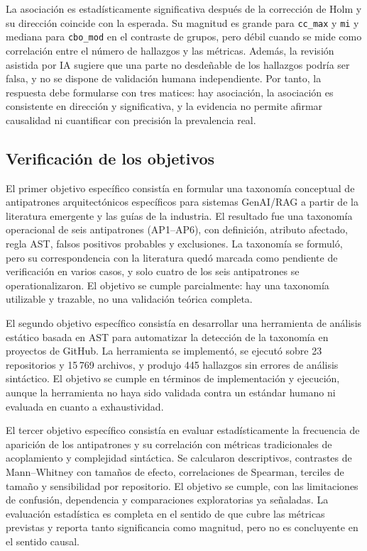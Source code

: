La asociación es estadísticamente significativa después de la corrección de Holm y su dirección coincide con la esperada. Su magnitud es grande para \texttt{cc\_max} y \texttt{mi} y mediana para \texttt{cbo\_mod} en el contraste de grupos, pero débil cuando se mide como correlación entre el número de hallazgos y las métricas. Además, la revisión asistida por IA sugiere que una parte no desdeñable de los hallazgos podría ser falsa, y no se dispone de validación humana independiente. Por tanto, la respuesta debe formularse con tres matices: hay asociación, la asociación es consistente en dirección y significativa, y la evidencia no permite afirmar causalidad ni cuantificar con precisión la prevalencia real.

\subsection{Verificación de los objetivos}

El primer objetivo específico consistía en formular una taxonomía conceptual de antipatrones arquitectónicos específicos para sistemas GenAI/RAG a partir de la literatura emergente y las guías de la industria. El resultado fue una taxonomía operacional de seis antipatrones (AP1--AP6), con definición, atributo afectado, regla AST, falsos positivos probables y exclusiones. La taxonomía se formuló, pero su correspondencia con la literatura quedó marcada como pendiente de verificación en varios casos, y solo cuatro de los seis antipatrones se operationalizaron. El objetivo se cumple parcialmente: hay una taxonomía utilizable y trazable, no una validación teórica completa.

El segundo objetivo específico consistía en desarrollar una herramienta de análisis estático basada en AST para automatizar la detección de la taxonomía en proyectos de GitHub. La herramienta se implementó, se ejecutó sobre 23 repositorios y 15\,769 archivos, y produjo 445 hallazgos sin errores de análisis sintáctico. El objetivo se cumple en términos de implementación y ejecución, aunque la herramienta no haya sido validada contra un estándar humano ni evaluada en cuanto a exhaustividad.

El tercer objetivo específico consistía en evaluar estadísticamente la frecuencia de aparición de los antipatrones y su correlación con métricas tradicionales de acoplamiento y complejidad sintáctica. Se calcularon descriptivos, contrastes de Mann--Whitney con tamaños de efecto, correlaciones de Spearman, terciles de tamaño y sensibilidad por repositorio. El objetivo se cumple, con las limitaciones de confusión, dependencia y comparaciones exploratorias ya señaladas. La evaluación estadística es completa en el sentido de que cubre las métricas previstas y reporta tanto significancia como magnitud, pero no es concluyente en el sentido causal.

